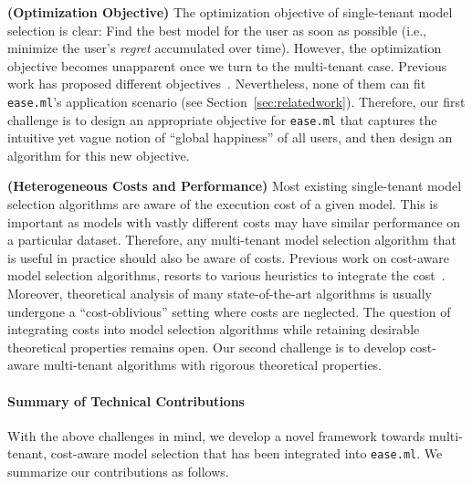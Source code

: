 \documentclass[letterpaper]{vldb}
\newcommand{\eml}{\texttt{ease.ml}\xspace}
\begin{document}
\noindent
{\bf (Optimization Objective)}
The optimization objective of single-tenant model selection is clear: Find the best model for the user as soon as 
possible (i.e., minimize the user's {\em regret} accumulated over time).
However, the optimization objective becomes unapparent once we turn to the multi-tenant case.
Previous work has proposed different objectives~\cite{XXX}.
Nevertheless, none of them can fit \eml's application scenario (see Section~\ref{sec:relatedwork}).
Therefore, our first challenge is to design an appropriate objective for \eml that captures the intuitive yet vague notion of ``global happiness'' of all users, and then design 
an algorithm for this new objective.
 

\noindent
{\bf (Heterogeneous Costs and Performance)} Most
existing single-tenant model selection
 algorithms are aware of the execution cost of
  a given model. This is important as models with
  vastly different costs may have similar performance 
  on a particular dataset. Therefore, any multi-tenant
  model selection algorithm that is useful in practice should also
  be aware of costs.
  Previous work on cost-aware model selection algorithms, resorts to various heuristics to integrate the cost~\cite{XXX}.
  Moreover, theoretical analysis of many state-of-the-art algorithms is usually undergone a ``cost-oblivious'' setting where costs are neglected.
  The question of integrating costs into model selection algorithms while retaining desirable theoretical properties remains open.
  Our second challenge is to develop cost-aware multi-tenant algorithms with rigorous theoretical properties.
  
\vspace{-1em}
\paragraph*{Summary of Technical Contributions}


With the above challenges in mind, we develop a novel framework towards multi-tenant, cost-aware model selection that has been integrated into \eml. We summarize our contributions as follows.
\end{document}
